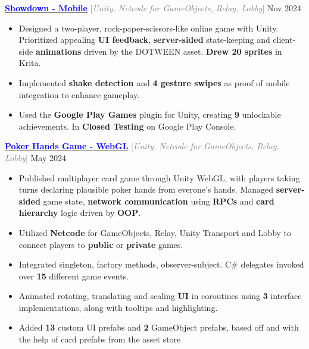 \documentclass[9pt]{developercv} %
\begin{document}
\begin{minipage}[t]{\textwidth}
	\vspace{-\baselineskip}
	\textbf{\href{https://youtube.com/shorts/Q4wsoV7939M}{\textcolor{blue}{Showdown - Mobile}}} \quad \textcolor{gray}{[\;\textit{Unity, Netcode for GameObjects, Relay, Lobby}\;]} \hfill Nov 2024
	\begin{itemize}[noitemsep,topsep=0pt]
		\item Designed a two-player, rock-paper-scissors-like online game with Unity. Prioritized appealing \textbf{UI feedback},
		\textbf{server-sided} state-keeping and client-side \textbf{animations} driven by the DOTWEEN asset.
		\textbf{Drew 20 sprites} in Krita.
		\item Implemented \textbf{shake detection} and \textbf{4 gesture swipes} as proof of mobile integration to enhance gameplay.
		\item Used the \textbf{Google Play Games} plugin for Unity, creating \textbf{9} unlockable achievements. In \textbf{Closed Testing} on Google Play Console.
	\end{itemize}
	\vspace{0.3em}

	\textbf{\href{https://henryhu.dev/pokerbsgame/index.html}{\textcolor{blue}{Poker Hands Game - WebGL}}} \quad \textcolor{gray}{[\;\textit{Unity, Netcode for GameObjects, Relay, Lobby}\;]} \hfill May 2024
	\begin{itemize}[noitemsep,topsep=0pt]
		\item Published multiplayer card game through Unity WebGL, with players taking turns declaring plausible poker hands from everone's hands.
		Managed \textbf{server-sided} game state, \textbf{network communication} using \textbf{RPCs} and \textbf{card hierarchy} logic driven by \textbf{OOP}.
		\item Utilized \textbf{Netcode} for GameObjects, Relay, Unity Transport and Lobby to connect players to \textbf{public} or \textbf{private} games.
		\item Integrated singleton, factory methods, observer-subject. C\# delegates invoked over \textbf{15} different game events.
		\item Animated rotating, translating and scaling \textbf{UI} in coroutines using \textbf{3} interface implementations, along with tooltips and highlighting.
		\item Added \textbf{13} custom UI prefabs and \textbf{2} GameObject prefabs, based off and with the help of card prefabs from the asset store
	\end{itemize}
	\vspace{0.3em}


\end{minipage}
\end{document}

